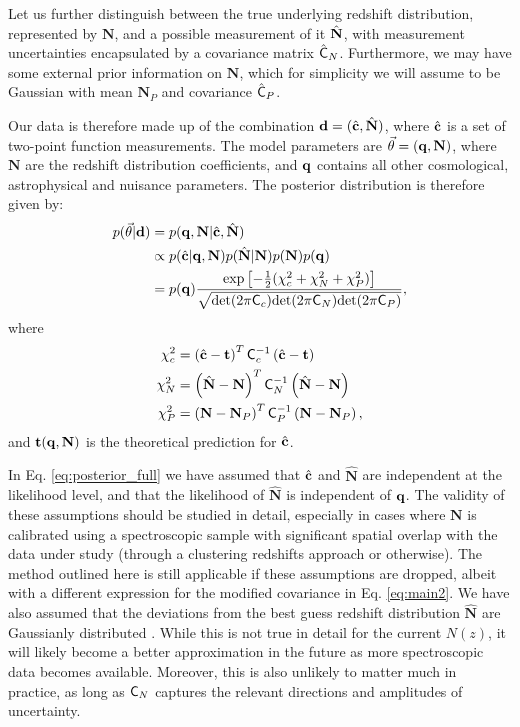 \documentclass[a4paper,11pt]{article}
\newcommand{\vN}{\mathbf{N}}
\begin{document}
      Let us further distinguish between the true underlying redshift distribution, represented by $\vN$, and a possible measurement of it $\hat{\bf N}$, with measurement uncertainties encapsulated by a covariance matrix $\hat{\sf C}_N$. Furthermore, we may have some external prior information on $\vN$, which for simplicity we will assume to be Gaussian with mean $\vN_P$ and covariance $\hat{\sf C}_P$.
      
      Our data is therefore made up of the combination ${\bf d}=(\hat{\bf c},\hat{\bf N})$, where $\hat{\bf c}$ is a set of two-point function measurements. The model parameters are $\vec{\theta}=({\bf q},\vN)$, where $\vN$ are the redshift distribution coefficients, and ${\bf q}$ contains all other cosmological, astrophysical and nuisance parameters. The posterior distribution is therefore given by:
      \begin{align}
        p(\vec{\theta}|{\bf d})
        &=p({\bf q},\vN|\hat{\bf c},\hat{\bf N})\\\label{eq:posterior_full}
        &\propto p(\hat{\bf c}|{\bf q},\vN)p(\hat{\bf N}|\vN)p(\vN)p({\bf q})\\
        &=p({\bf q})\frac{\exp\left[-\frac{1}{2}(\chi^2_c+\chi^2_N+\chi^2_P)\right]}{\sqrt{{\rm det}(2\pi{\sf C}_c){\rm det}(2\pi{\sf C}_N){\rm det}(2\pi{\sf C}_P)}},
      \end{align}
      where
      \begin{align}
        \chi^2_c&=\left(\hat{\bf c}-{\bf t}\right)^T{\sf C}_c^{-1}\left(\hat{\bf c}-{\bf t}\right)\\
        \chi^2_N&=\left(\hat{\bf N}-\vN\right)^T{\sf C}_N^{-1}\left(\hat{\bf N}-\vN\right)\\
        \chi^2_P&=\left(\vN-\vN_P\right)^T{\sf C}_P^{-1}\left(\vN-\vN_P\right),
      \end{align}
      and ${\bf t}({\bf q},\vN)$ is the theoretical prediction for $\hat{\bf c}$.
      
      In Eq. \ref{eq:posterior_full} we have assumed that $\hat{\bf c}$ and $\hat{\vN}$ are independent at the likelihood level, and that the likelihood of $\hat{\vN}$ is independent of ${\bf q}$. The validity of these assumptions should be studied in detail, especially in cases where $\vN$ is calibrated using a spectroscopic sample with significant spatial overlap with the data under study (through a clustering redshifts approach \cite{2008ApJ...684...88N} or otherwise). The method outlined here is still applicable if these assumptions are dropped, albeit with a different expression for the modified covariance in Eq. \ref{eq:main2}. We have also assumed that the deviations from the best guess redshift distribution $\hat{\vN}$ are Gaussianly distributed \cite{2004.09542}. While this is not true in detail for the current $N(z)$, it will likely become a better approximation in the future as more spectroscopic data becomes available. Moreover, this is also unlikely to  matter much in practice, as long as ${\sf C}_N$ captures the relevant directions and amplitudes of uncertainty. 
\end{document}
